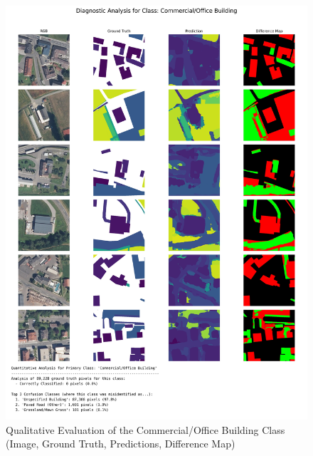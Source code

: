 \documentclass{report}
\begin{document}
\begin{figure}
    \centering
    \includegraphics[width=1.2\linewidth]{own_images/low_res_greater_100_sqm_diagnostic_2_Commercial_Office Building.jpg}
    \caption{Qualitative Evaluation of the Commercial/Office Building Class (Image, Ground Truth, Predictions, Difference Map)}
    \label{fig:qual_eval_commercial_building}
\end{figure}
\end{document}
